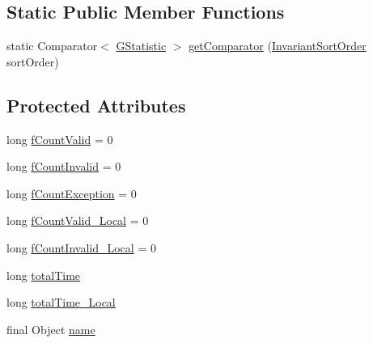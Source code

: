 \subsection*{Static Public Member Functions}
\begin{DoxyCompactItemize}
\item 
static Comparator$<$ \hyperlink{classorg_1_1tzi_1_1use_1_1gen_1_1tool_1_1statistics_1_1_g_statistic}{G\-Statistic} $>$ \hyperlink{classorg_1_1tzi_1_1use_1_1gen_1_1tool_1_1statistics_1_1_g_statistic_ac27ce1fa9331d5def8e69095a119d7af}{get\-Comparator} (\hyperlink{enumorg_1_1tzi_1_1use_1_1gen_1_1tool_1_1_g_generator_arguments_1_1_invariant_sort_order}{Invariant\-Sort\-Order} sort\-Order)
\end{DoxyCompactItemize}
\subsection*{Protected Attributes}
\begin{DoxyCompactItemize}
\item 
long \hyperlink{classorg_1_1tzi_1_1use_1_1gen_1_1tool_1_1statistics_1_1_g_statistic_aeec8ea2060a4fedbf3cafc4514687e09}{f\-Count\-Valid} = 0
\item 
long \hyperlink{classorg_1_1tzi_1_1use_1_1gen_1_1tool_1_1statistics_1_1_g_statistic_aeb994e195ad5de11356014fcd8a10ebe}{f\-Count\-Invalid} = 0
\item 
long \hyperlink{classorg_1_1tzi_1_1use_1_1gen_1_1tool_1_1statistics_1_1_g_statistic_a8e312f411a4bf54aa2b9351a589232d1}{f\-Count\-Exception} = 0
\item 
long \hyperlink{classorg_1_1tzi_1_1use_1_1gen_1_1tool_1_1statistics_1_1_g_statistic_aeaa49c09aa01532259af89fca1121b02}{f\-Count\-Valid\-\_\-\-Local} = 0
\item 
long \hyperlink{classorg_1_1tzi_1_1use_1_1gen_1_1tool_1_1statistics_1_1_g_statistic_a4b4b5b568bb67f09c46ccf4cafada460}{f\-Count\-Invalid\-\_\-\-Local} = 0
\item 
long \hyperlink{classorg_1_1tzi_1_1use_1_1gen_1_1tool_1_1statistics_1_1_g_statistic_ad02687a084712fbf4a075b2c37a73b6e}{total\-Time}
\item 
long \hyperlink{classorg_1_1tzi_1_1use_1_1gen_1_1tool_1_1statistics_1_1_g_statistic_a46bbc8e2d98746061f547b11e059dcf9}{total\-Time\-\_\-\-Local}
\item 
final Object \hyperlink{classorg_1_1tzi_1_1use_1_1gen_1_1tool_1_1statistics_1_1_g_statistic_a39c74856cd7b4e4dae3366c182ff808e}{name}
\end{DoxyCompactItemize}


